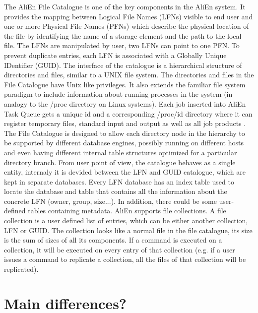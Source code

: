The AliEn File Catalogue is one of the key components in the AliEn system. It provides the mapping between 
Logical File Names (LFNs) visible to end user and one or more Physical File Names (PFNs) which describe 
the physical location of the file by identifying the name of a storage element and the path to the local file. 
The LFNs are manipulated by user, two LFNs can point to one PFN. To prevent duplicate entries, each LFN is associated
with a Globally Unique IDentifier (GUID).  
The interface of the catalogue is a hierarchical structure of directories and files, similar to a UNIX file system.
The directories and files in the File Catalogue have Unix like privileges. It also extends the familiar file system
paradigm to include information about running processes in the system (in analogy to the /proc directory on Linux
systems). Each job inserted into AliEn Task Queue gets a unique id and a corresponding /proc/id directory where it
can register temporary files, standard input and output as well as all job products \cite{AliEn1}.
The File Catalogue is designed to allow each directory node in the hierarchy to be supported by different 
database engines, possibly running on different hosts and even having different internal table structures
optimized for a particular directory branch. 
From user point of view, the catalogue behaves as a single entity, internaly it is devided between the LFN and GUID
catalogue, which are kept in separate databases. Every LFN database has an index table used to locate the database
and table that contains all the information about the concrete LFN (owner, group, size...).  In addition, there 
could be some user-defined tables containing metadata.
AliEn supports file collections. A file collection is a user defined list of entries, which can be either another 
collection, LFN or GUID. The collection looks like a normal file in the file catalogue, its size is the sum of 
sizes of all its components. If a command is executed on a collection, it will be executed on every entry of that
collection (e.g. if a user issues a command to replicate a collection, all the files of that collection will be 
replicated). 

\section{Main differences?}